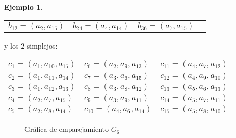 \documentclass[12pt]{book}
\theoremstyle{definition}
\newtheorem{example}[theorem]{Ejemplo}
\newcounter{in}
\begin{document}
\begin{example}
\begin{center}
\begin{tabular}[h]{llll}
      $b_{12}=(a_{2},a_{15})$ & $b_{24}=(a_{4},a_{14})$ & $b_{36}=(a_{7},a_{15})$ &  
    \end{tabular}
  \end{center}
  y los $2$-simplejos:
  \begin{center}
    \begin{tabular}[h]{lll}
      $c_{1}=(a_{1},a_{10},a_{15})$ & $c_{6}=(a_{2},a_{9},a_{13})$ & $c_{11}=(a_{4},a_{7},a_{12})$  \\
      $c_{2}=(a_{1},a_{11},a_{14})$ & $c_{7}=(a_{3},a_{6},a_{15})$ & $c_{12}=(a_{4},a_{9},a_{10})$  \\
      $c_{3}=(a_{1},a_{12},a_{13})$ & $c_{8}=(a_{3},a_{8},a_{12})$ & $c_{13}=(a_{5},a_{6},a_{13})$  \\
      $c_{4}=(a_{2},a_{7},a_{15})$ & $c_{9}=(a_{3},a_{9},a_{11})$ & $c_{14}=(a_{5},a_{7},a_{11})$  \\
      $c_{5}=(a_{2},a_{8},a_{14})$ & $c_{10}=(a_{4},a_{6},a_{14})$ & $c_{15}=(a_{5},a_{8},a_{10})$  
    \end{tabular}
  \end{center}

\begin{figure}[h]
  \centering
  
  \caption{Gráfica de emparejamiento $G_{6}$}
  \label{fig:emparejamiento6}
\end{figure}


\end{example}
\end{document}
